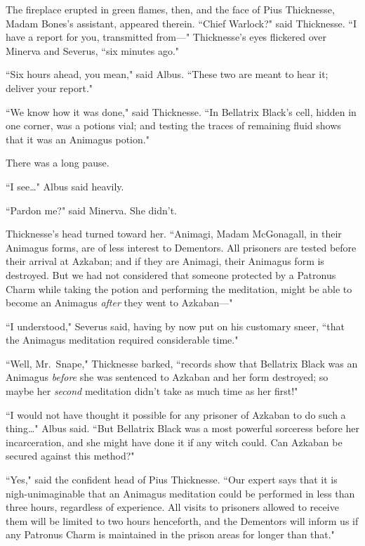 The fireplace erupted in green flames, then, and the face of Pius Thicknesse, Madam Bones's assistant, appeared therein. ``Chief Warlock?" said Thicknesse. ``I have a report for you, transmitted from—" Thicknesse's eyes flickered over Minerva and Severus, ``six minutes ago."

``Six hours ahead, you mean," said Albus. ``These two are meant to hear it; deliver your report."

``We know how it was done," said Thicknesse. ``In Bellatrix Black's cell, hidden in one corner, was a potions vial; and testing the traces of remaining fluid shows that it was an Animagus potion."

There was a long pause.

``I see{\ldots}" Albus said heavily.

``Pardon me?" said Minerva. She didn't.

Thicknesse's head turned toward her. ``Animagi, Madam McGonagall, in their Animagus forms, are of less interest to Dementors. All prisoners are tested before their arrival at Azkaban; and if they are Animagi, their Animagus form is destroyed. But we had not considered that someone protected by a Patronus Charm while taking the potion and performing the meditation, might be able to become an Animagus \emph{after} they went to Azkaban—"

``I understood," Severus said, having by now put on his customary sneer, ``that the Animagus meditation required considerable time."

``Well, Mr.~Snape," Thicknesse barked, ``records show that Bellatrix Black was an Animagus \emph{before} she was sentenced to Azkaban and her form destroyed; so maybe her \emph{second} meditation didn't take as much time as her first!"

``I would not have thought it possible for any prisoner of Azkaban to do such a thing{\ldots}" Albus said. ``But Bellatrix Black was a most powerful sorceress before her incarceration, and she might have done it if any witch could. Can Azkaban be secured against this method?"

``Yes," said the confident head of Pius Thicknesse. ``Our expert says that it is nigh-unimaginable that an Animagus meditation could be performed in less than three hours, regardless of experience. All visits to prisoners allowed to receive them will be limited to two hours henceforth, and the Dementors will inform us if any Patronus Charm is maintained in the prison areas for longer than that."

